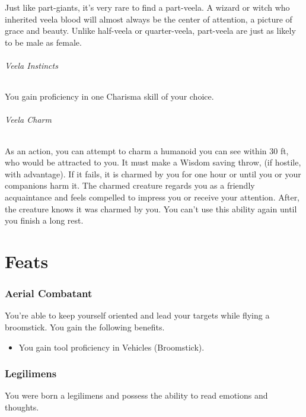 \documentclass[a4paper,twocolumn,openany,nodeprecatedcode]{dndbook}
\begin{document}
        Just like part-giants, it's very rare to find a part-veela. A wizard or witch who inherited veela blood will almost always be the center of attention, a picture of grace and beauty. Unlike half-veela or quarter-veela, part-veela are just as likely to be male as female.

        \subparagraph{Veela Instincts} You gain proficiency in one Charisma skill of your choice.
        \subparagraph{Veela Charm} As an action, you can attempt to charm a humanoid you can see within 30 ft, who would be attracted to you. It must make a Wisdom saving throw, (if hostile, with advantage). If it fails, it is charmed by you for one hour or until you or your companions harm it. The charmed creature regards you as a friendly acquaintance and feels compelled to impress you or receive your attention. After, the creature knows it was charmed by you. You can't use this ability again until you finish a long rest.


\chapter{Feats}

    \subsection{Aerial Combatant}

        You're able to keep yourself oriented and lead your targets while flying a broomstick.
        You gain the following benefits.

        \begin{itemize}
            \item You gain tool proficiency in Vehicles (Broomstick).
        \end{itemize}


    \subsection{Legilimens}

        You were born a legilimens and possess the ability to read emotions and thoughts.\\
\end{document}

